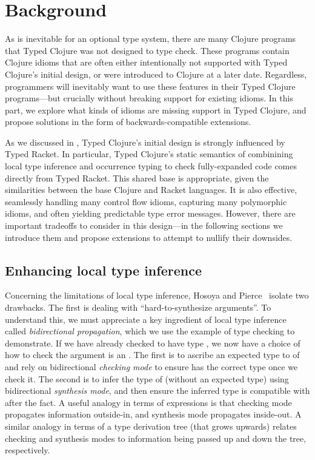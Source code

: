 \chapter{Background}

As is inevitable for an optional type system, there are many
Clojure programs that Typed Clojure was not designed to type check.
These programs contain Clojure idioms that are often either intentionally
not supported with Typed Clojure's initial design, or 
were introduced to Clojure at a later date.
Regardless, programmers will inevitably want to use these features 
in their Typed Clojure programs---but crucially without breaking
support for existing idioms.
In this part, we explore what kinds of idioms are missing
support in Typed Clojure, and propose solutions in the form of
backwards-compatible extensions.

As we discussed in , Typed Clojure's initial
design is strongly influenced by Typed Racket. In particular,
Typed Clojure's static semantics of
combinining local type inference and occurrence typing
to check fully-expanded code
comes directly from Typed Racket.
This shared base is appropriate, given the similarities between
the base Clojure and Racket languages.
It is also effective, seamlessly handling many control flow
idioms, capturing many polymorphic idioms, and often yielding
predictable type error messages.
However, there are important tradeoffs to consider in this design---in the following
sections we introduce them and propose extensions to attempt to nullify
their downsides.

\section{Enhancing local type inference}

Concerning the limitations of local type inference,
Hosoya and Pierce~\cite{hosoya1999good}
isolate two drawbacks.
The first is dealing with ``hard-to-synthesize arguments''.
To understand this, we must appreciate a key ingredient of local type inference
called \emph{bidirectional propagation}, which 
we use the example of type checking  to demonstrate.
If we have already checked  to have type , we
now have a choice of how to check the argument  is an .
The first is to ascribe an expected type to  of 
and rely on
bidirectional \emph{checking mode} to ensure  has the correct type
once we check it.
The second is to infer the type of  (without an expected type) using 
bidirectional \emph{synthesis mode}, and then ensure the inferred type
is compatible with  after the fact.
A useful analogy in terms of expressions is that checking mode propagates
information outside-in, and synthesis mode propagates inside-out.
A similar analogy in terms of a type derivation tree (that grows upwards)
relates checking and synthesis modes to information being passed
up and down the tree, respectively.

